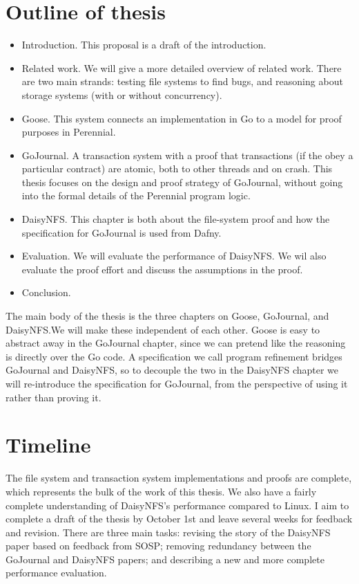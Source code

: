 \section{Outline of thesis}

\begin{itemize}
  \item Introduction. This proposal is a draft of the introduction.
  \item Related work. We will give a more detailed overview of related work.
        There are two main strands: testing file systems to find bugs, and
        reasoning about storage systems (with or without concurrency).
  \item Goose. This system connects an implementation in Go to a model for proof
        purposes in Perennial.
  \item GoJournal. A transaction system with a proof that transactions (if the
        obey a particular contract) are atomic, both to other threads and on
        crash. This thesis focuses on the design and proof strategy of
        GoJournal, without going into the formal details of the Perennial
        program logic.
  \item DaisyNFS. This chapter is both about the file-system proof and how the
        specification for GoJournal is used from Dafny.
  \item Evaluation. We will evaluate the performance of DaisyNFS. We wil also
        evaluate the proof effort and discuss the assumptions in the proof.
  \item Conclusion.
\end{itemize}

The main body of the thesis is the three chapters on Goose, GoJournal, and
DaisyNFS.\@ We will make these independent of each other. Goose is easy to
abstract away in the GoJournal chapter, since we can pretend like the reasoning
is directly over the Go code. A specification we call program refinement bridges
GoJournal and DaisyNFS, so to decouple the two in the DaisyNFS chapter we will
re-introduce the specification for GoJournal, from the perspective of using it
rather than proving it.

\section{Timeline}
The file system and transaction system implementations and proofs are complete,
which represents the bulk of the work of this thesis. We also have a fairly
complete understanding of DaisyNFS's performance compared to Linux. I aim to
complete a draft of the thesis by October 1st and leave several weeks for
feedback and revision. There are three main tasks: revising the story of the
DaisyNFS paper based on feedback from SOSP; removing redundancy between the
GoJournal and DaisyNFS papers; and describing a new and more complete
performance evaluation.
